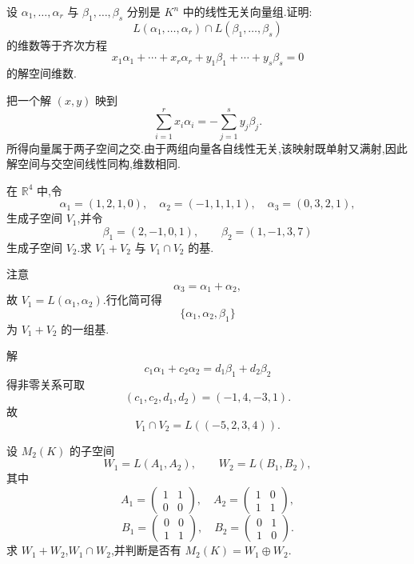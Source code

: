 \begin{example}
设 $\alpha_1,\ldots,\alpha_r$ 与 $\beta_1,\ldots,\beta_s$ 分别是 $K^n$ 中的线性无关向量组.证明:
\[
L(\alpha_1,\ldots,\alpha_r)\cap L(\beta_1,\ldots,\beta_s)
\]
的维数等于齐次方程
\[
 x_1\alpha_1+\cdots+x_r\alpha_r
 +y_1\beta_1+\cdots+y_s\beta_s=0
\]
的解空间维数.
\end{example}
\exampleblank

\begin{solution}
把一个解 $(x,y)$ 映到
\[
\displaystyle\sum_{i=1}^r x_i\alpha_i=-\sum_{j=1}^s y_j\beta_j.
\]
所得向量属于两子空间之交.由于两组向量各自线性无关,该映射既单射又满射,因此解空间与交空间线性同构,维数相同.
\end{solution}

\begin{example}
在 $\mathbb{R}^4$ 中,令
\[
\alpha_1=(1,2,1,0),\quad
\alpha_2=(-1,1,1,1),\quad
\alpha_3=(0,3,2,1),
\]
生成子空间 $V_1$,并令
\[
\beta_1=(2,-1,0,1),\qquad
\beta_2=(1,-1,3,7)
\]
生成子空间 $V_2$.求 $V_1+V_2$ 与 $V_1\cap V_2$ 的基.
\end{example}
\exampleblank

\begin{solution}
注意
\[
\alpha_3=\alpha_1+\alpha_2,
\]
故 $V_1=L(\alpha_1,\alpha_2)$.行化简可得
\[
\{\alpha_1,\alpha_2,\beta_1\}
\]
为 $V_1+V_2$ 的一组基.

解
\[
 c_1\alpha_1+c_2\alpha_2=d_1\beta_1+d_2\beta_2
\]
得非零关系可取
\[
(c_1,c_2,d_1,d_2)=(-1,4,-3,1).
\]
故
\[
V_1\cap V_2=L((-5,2,3,4)).
\]
\end{solution}

\begin{example}
设 $M_2(K)$ 的子空间
\[
W_1=L(A_1,A_2),\qquad W_2=L(B_1,B_2),
\]
其中
\[
A_1=\begin{pmatrix}1&1\\0&0\end{pmatrix},\quad
A_2=\begin{pmatrix}1&0\\1&1\end{pmatrix},
\]
\[
B_1=\begin{pmatrix}0&0\\1&1\end{pmatrix},\quad
B_2=\begin{pmatrix}0&1\\1&0\end{pmatrix}.
\]
求 $W_1+W_2$,$W_1\cap W_2$,并判断是否有 $M_2(K)=W_1\oplus W_2$.
\end{example}
\exampleblank

